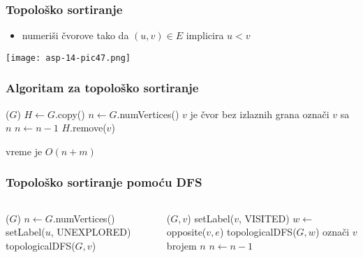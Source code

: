 \documentclass[compress,aspectratio=169]{beamer}
\renewcommand{\algorithmiccomment}[1]{\hfill \{\myred{#1}\}}
\begin{document}
\begin{frame}[fragile]
  \frametitle{Topološko sortiranje}
  \begin{itemize}
    \item numeriši čvorove tako da $(u,v) \in E$ implicira $u<v$ 
  \end{itemize}
  \begin{center}
    \texttt{[image: asp-14-pic47.png]}
  \end{center}
\end{frame}

\begin{frame}[fragile]
  \frametitle{Algoritam za topološko sortiranje}
  \begin{algorithmic}
    \STATE {}($G$)
    \STATE $H \leftarrow G$.copy()
    \STATE $n \leftarrow G$.numVertices()
      \STATE $v$ je čvor bez izlaznih grana
      \STATE označi $v$ sa $n$
      \STATE $n \leftarrow n-1$
      \STATE $H$.remove($v$)
    \ENDWHILE
  \end{algorithmic}
  \hfill vreme je $O(n+m)$
\end{frame}

\renewcommand{\algorithmiccomment}[1]{\{\myred{#1}\}}

\begin{frame}[fragile]
  \frametitle{Topološko sortiranje pomoću DFS}
  {\small
  \begin{columns}
    \begin{column}[t]{6cm}
      \begin{algorithmic}
        \STATE {}($G$)
        \STATE $n \leftarrow G$.numVertices()
          \STATE setLabel($u$, {\scriptsize UNEXPLORED})
        \ENDFOR
            \STATE topologicalDFS($G,v$)
          \ENDIF
        \ENDFOR
      \end{algorithmic}
    \end{column}
    \begin{column}[t]{6cm}
      \begin{algorithmic}
        \STATE {}($G,v$)
        \STATE setLabel($v$, {\scriptsize VISITED})
          \STATE $w \leftarrow$ opposite($v,e$)
            \STATE {}
            \STATE topologicalDFS($G,w$) 
          \ELSE
            \STATE {}
            \STATE označi $v$ brojem $n$ 
          \ENDIF
        \ENDFOR{}
        \STATE $n \leftarrow n-1$
      \end{algorithmic}
    \end{column}
  \end{columns}
  }
\end{frame}
\end{document}
